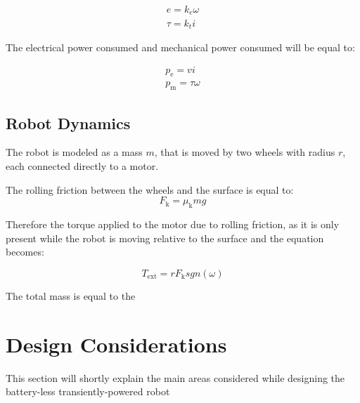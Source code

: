 \begin{equation}
\begin{gathered}
e = k_{e} \omega \\
\tau = k_{t} i
\end{gathered}
\end{equation}

\noindent
The electrical power consumed and mechanical power consumed will be equal to:

\begin{equation}
\begin{gathered}
p_{\text{e}} = vi \\
p_{\text{m}} = \tau\omega
\end{gathered}
\end{equation}


\subsection{Robot Dynamics}
The robot is modeled as a mass $m$, that is moved by two wheels with radius $r$, each connected directly to a motor.


The rolling friction between the wheels and the surface is equal to:
\begin{equation}
F_{\text{k}} = \mu_{\text{k}}mg
\end{equation}

Therefore the torque applied to the motor due to rolling friction, as it is only present while the robot is moving relative to the surface and the equation becomes:

\begin{equation}
T_{\text{ext}} = rF_{\text{k}} sgn(\omega)
\end{equation}

\noindent
The total mass is equal to the 



\section{Design Considerations}
\label{sec:design_considerations}

This section will shortly explain the main areas considered while designing the battery-less transiently-powered robot


